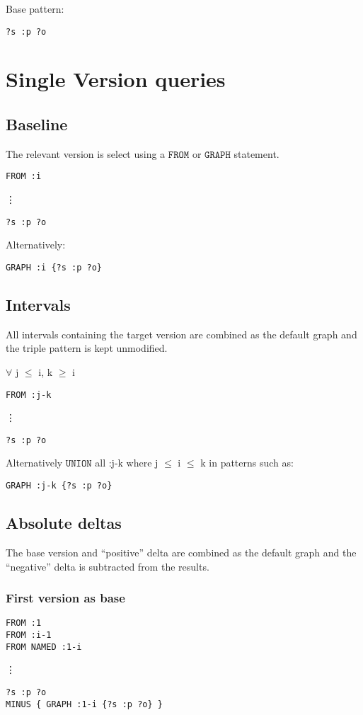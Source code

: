 Base pattern:
\begin{verbatim}
?s :p ?o
\end{verbatim}

\section{Single Version queries}
\subsection{Baseline}
The relevant version is select using a $\mathtt{FROM}$ or $\mathtt{GRAPH}$ statement.
\begin{verbatim}
FROM :i
\end{verbatim}
\vdots
\begin{verbatim}
?s :p ?o
\end{verbatim}
Alternatively:
\begin{verbatim}
GRAPH :i {?s :p ?o}
\end{verbatim}


\subsection{Intervals}
All intervals containing the target version are combined as the default graph and the triple pattern is kept unmodified. 


$\forall$ j $\leq$ i, k $\geq$ i
\begin{verbatim}
FROM :j-k
\end{verbatim}
\vdots
\begin{verbatim}
?s :p ?o
\end{verbatim}
Alternatively $\mathtt{UNION}$ all :j-k where j $\leq$ i $\leq$ k in patterns such as:
\begin{verbatim}
GRAPH :j-k {?s :p ?o}
\end{verbatim}
\subsection{Absolute deltas}
The base version and ``positive'' delta are combined as the default graph and the ``negative'' delta is subtracted from the results.
\subsubsection{First version as base}
\begin{verbatim}
FROM :1
FROM :i-1
FROM NAMED :1-i
\end{verbatim}
\vdots
\begin{verbatim}
?s :p ?o
MINUS { GRAPH :1-i {?s :p ?o} }
\end{verbatim}

